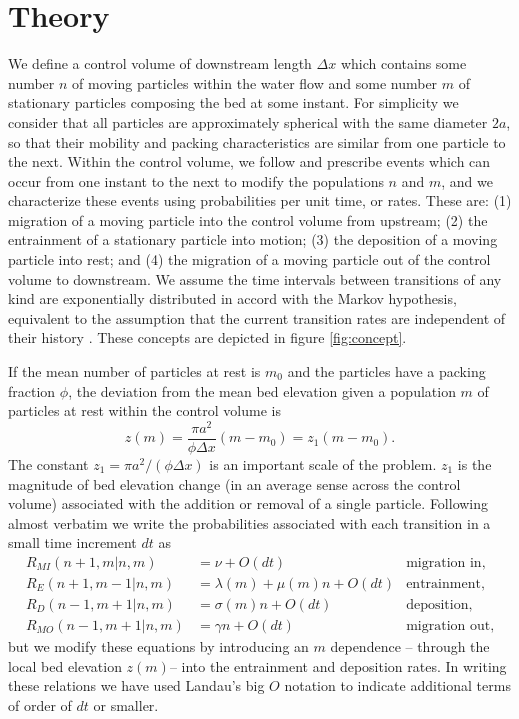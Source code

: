 \documentclass[draft]{agujournal2018}
\newcommand\be{\begin{equation}} %
\newcommand\ee{\end{equation}}   %
\begin{document}
\section{Theory}

We define a control volume of downstream length $\Delta x$ which contains some number $n$ of moving particles within the water flow and some number $m$ of stationary particles composing the bed at some instant.
For simplicity we consider that all particles are approximately spherical with the same diameter $2a$, so that their mobility and packing characteristics are similar from one particle to the next.
Within the control volume, we follow \citet{Ancey2008} and prescribe events which can occur from one instant to the next to modify the populations $n$ and $m$, and we characterize these events using probabilities per unit time, or rates.
These are: (1) migration of a moving particle into the control volume from upstream; (2) the entrainment of a stationary particle into motion; (3) the deposition of a moving particle into rest; and (4) the migration of a moving particle out of the control volume to downstream.
We assume the time intervals between transitions of any kind are exponentially distributed in accord with the Markov hypothesis, equivalent to the assumption that the current transition rates are independent of their history \citep[e.g.][]{Cox1965}.
These concepts are depicted in figure \ref{fig:concept}. 

If the mean number of particles at rest is $m_0$ and the particles have a packing fraction $\phi$, the deviation from the mean bed elevation given a population $m$ of particles at rest within the control volume is
\be z(m) = \frac{\pi a^2}{\phi \Delta x}(m-m_0) = z_1(m-m_0). \label{eq:ele}\ee
The constant $z_1 = \pi a^2/(\phi\Delta x)$ is an important scale of the problem. 
$z_1$ is the magnitude of bed elevation change (in an average sense across the control volume) associated with the addition or removal of a single particle. 
Following \citet{Ancey2008} almost verbatim we write the probabilities associated with each transition in a small time increment $dt$ as 
\begin{align}
 R_{MI}(n+1,m| n, m) &= \nu + O(dt) & \text{migration in},\\
 R_E(n+1,m-1| n,m)  &= \lambda(m) + \mu(m) n + O(dt) & \text{entrainment},  \\
 R_D(n-1,m+1|n,m) &= \sigma(m) n + O(dt) & \text{deposition},\\
 R_{MO}(n-1,m+1|n,m) &= \gamma n + O(dt) & \text{migration out},
\end{align}
but we modify these equations by introducing an $m$ dependence -- through the local bed elevation $z(m)$-- into the entrainment and deposition rates. 
In writing these relations we have used Landau's big $O$ notation to indicate additional terms of order of $dt$ or smaller.
\end{document}
